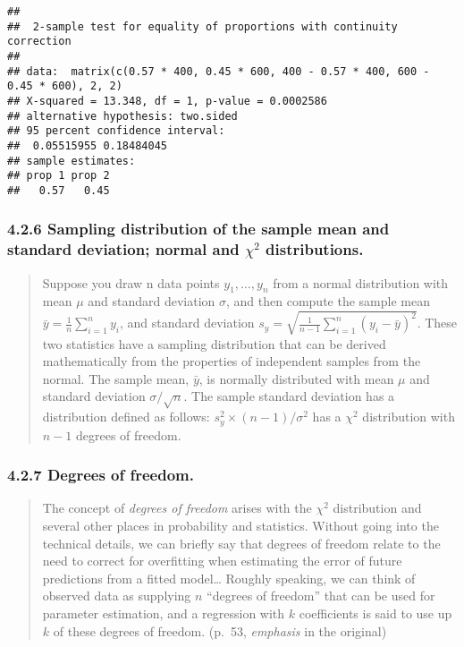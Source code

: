 \documentclass[
]{article}
\begin{document}
\begin{verbatim}
## 
##  2-sample test for equality of proportions with continuity correction
## 
## data:  matrix(c(0.57 * 400, 0.45 * 600, 400 - 0.57 * 400, 600 - 0.45 * 600), 2, 2)
## X-squared = 13.348, df = 1, p-value = 0.0002586
## alternative hypothesis: two.sided
## 95 percent confidence interval:
##  0.05515955 0.18484045
## sample estimates:
## prop 1 prop 2 
##   0.57   0.45
\end{verbatim}

\hypertarget{sampling-distribution-of-the-sample-mean-and-standard-deviation-normal-and-chi2-distributions.}{%
\subsubsection{\texorpdfstring{4.2.6 Sampling distribution of the sample
mean and standard deviation; normal and \(\chi^2\)
distributions.}{4.2.6 Sampling distribution of the sample mean and standard deviation; normal and \textbackslash chi\^{}2 distributions.}}\label{sampling-distribution-of-the-sample-mean-and-standard-deviation-normal-and-chi2-distributions.}}

\begin{quote}
Suppose you draw n data points \(y_1, \dots, y_n\) from a normal
distribution with mean \(\mu\) and standard deviation \(\sigma\), and
then compute the sample mean
\(\bar y = \frac{1}{n} \sum_{i = 1}^n y_i\), and standard deviation
\(s_y = \sqrt{\frac{1}{n - 1} \sum_{i = 1}^n (y_i - \bar y)^2}\). These
two statistics have a sampling distribution that can be derived
mathematically from the properties of independent samples from the
normal. The sample mean, \(\bar y\), is normally distributed with mean
\(\mu\) and standard deviation \(\sigma / \sqrt n\). The sample standard
deviation has a distribution defined as follows:
\(s_y^2 \times (n - 1) / \sigma^2\) has a \(\chi^2\) distribution with
\(n - 1\) degrees of freedom.
\end{quote}

\hypertarget{degrees-of-freedom.}{%
\subsubsection{4.2.7 Degrees of freedom.}\label{degrees-of-freedom.}}

\begin{quote}
The concept of \emph{degrees of freedom} arises with the \(\chi^2\)
distribution and several other places in probability and statistics.
Without going into the technical details, we can briefly say that
degrees of freedom relate to the need to correct for overfitting when
estimating the error of future predictions from a fitted model\ldots{}
Roughly speaking, we can think of observed data as supplying \(n\)
``degrees of freedom'' that can be used for parameter estimation, and a
regression with \(k\) coefficients is said to use up \(k\) of these
degrees of freedom. (p.~53, \emph{emphasis} in the original)
\end{quote}
\end{document}
